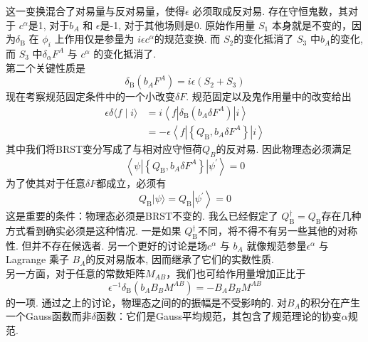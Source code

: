 这一变换混合了对易量与反对易量，使得$\epsilon$ 必须取成反对易. 存在守恒鬼数，其对于  $c^{\alpha}$是1, 对于$b_{A}$ 和 $\epsilon$是-1, 对于其他场则是0. 原始作用量 $S_{1}$ 本身就是不变的，因为$\delta_{\mathrm{B}}$ 在 $\phi_{i}$ 上作用仅是参量为 $i \epsilon c^{\alpha}$的规范变换. 而 $S_{2}$的变化抵消了 $S_{3}$ 中$b_{A}$的变化,而 $S_{3}$ 中$\delta_{\alpha} F^{A}$ 与 $c^{\alpha}$ 的变化抵消了.\\
第二个关键性质是
\begin{equation}
\delta_{\mathrm{B}}\left(b_{A} F^{A}\right)=i \epsilon\left(S_{2}+S_{3}\right)
\end{equation}
现在考察规范固定条件中的一个小改变$\delta F$. 规范固定以及鬼作用量中的改变给出
\begin{equation}
	\begin{aligned}
		\epsilon \delta\langle f \mid i\rangle &=i\left\langle f\left|\delta_{\mathrm{B}}\left(b_{A} \delta F^{A}\right)\right| i\right\rangle \\
		&=-\epsilon\left\langle f\left|\left\{Q_{\mathrm{B}}, b_{A} \delta F^{A}\right\}\right| i\right\rangle
	\end{aligned}
\end{equation}
其中我们将BRST变分写成了与相对应守恒荷$Q_B$的反对易. 因此物理态必须满足
\begin{equation}
\left\langle\psi\left|\left\{Q_{\mathrm{B}}, b_{A} \delta F^{A}\right\}\right| \psi^{\prime}\right\rangle=0
\end{equation}
为了使其对于任意$\delta F$都成立，必须有
\begin{equation}
Q_{\mathrm{B}}|\psi\rangle=Q_{\mathrm{B}}\left|\psi^{\prime}\right\rangle=0
\end{equation}
这是重要的条件：物理态必须是BRST不变的. 我么已经假定了 $Q_{\mathrm{B}}^{\dagger}=Q_{\mathrm{B}} $存在几种方式看到确实必须是这种情况. 一是如果 $Q_{\mathrm{B}}^{\dagger}$不同，将不得不有另一些其他的对称性. 但并不存在候选者. 另一个更好的讨论是场$c^{\alpha}$ 与 $b_{A}$ 就像规范参量$\epsilon^{\alpha}$ 与 Lagrange 乘子 $B_{A}$的反对易版本, 因而继承了它们的实数性质. \\
另一方面，对于任意的常数矩阵$M_{AB}$，我们也可给作用量增加正比于
\begin{equation}
\epsilon^{-1} \delta_{\mathrm{B}}\left(b_{A} B_{B} M^{A B}\right)=-B_{A} B_{B} M^{A B}
\end{equation}
的一项. 通过之上的讨论，物理态之间的的振幅是不受影响的. 对$B_{A}$的积分在产生一个Gauss函数而非$\delta$函数：它们是Gauss平均规范，其包含了规范理论的协变$\alpha$规范. \\

